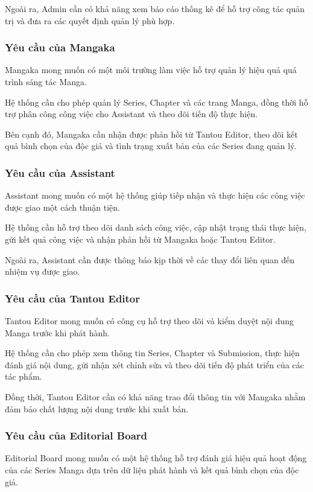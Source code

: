 \documentclass[12pt,a4paper]{article}
\begin{document}
Ngoài ra, Admin cần có khả năng xem báo cáo thống kê để hỗ trợ công tác quản trị và đưa ra các quyết định quản lý phù hợp.

\subsubsection{Yêu cầu của Mangaka}
Mangaka mong muốn có một môi trường làm việc hỗ trợ quản lý hiệu quả quá trình sáng tác Manga.

Hệ thống cần cho phép quản lý Series, Chapter và các trang Manga, đồng thời hỗ trợ phân công công việc cho Assistant và theo dõi tiến độ thực hiện.

Bên cạnh đó, Mangaka cần nhận được phản hồi từ Tantou Editor, theo dõi kết quả bình chọn của độc giả và tình trạng xuất bản của các Series đang quản lý.

\subsubsection{Yêu cầu của Assistant}
Assistant mong muốn có một hệ thống giúp tiếp nhận và thực hiện các công việc được giao một cách thuận tiện.

Hệ thống cần hỗ trợ theo dõi danh sách công việc, cập nhật trạng thái thực hiện, gửi kết quả công việc và nhận phản hồi từ Mangaka hoặc Tantou Editor.

Ngoài ra, Assistant cần được thông báo kịp thời về các thay đổi liên quan đến nhiệm vụ được giao.

\subsubsection{Yêu cầu của Tantou Editor}
Tantou Editor mong muốn có công cụ hỗ trợ theo dõi và kiểm duyệt nội dung Manga trước khi phát hành.

Hệ thống cần cho phép xem thông tin Series, Chapter và Submission, thực hiện đánh giá nội dung, gửi nhận xét chỉnh sửa và theo dõi tiến độ phát triển của các tác phẩm.

Đồng thời, Tantou Editor cần có khả năng trao đổi thông tin với Mangaka nhằm đảm bảo chất lượng nội dung trước khi xuất bản.

\subsubsection{Yêu cầu của Editorial Board}
Editorial Board mong muốn có một hệ thống hỗ trợ đánh giá hiệu quả hoạt động của các Series Manga dựa trên dữ liệu phát hành và kết quả bình chọn của độc giả.
\end{document}
